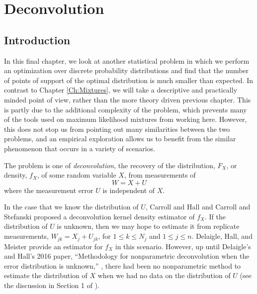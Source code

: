 \chapter{Deconvolution}
\label{Ch:Deconvolution}




\section{Introduction}
	In this final chapter, we look at another statistical problem in which we perform an optimization over discrete probability distributions and find that the number of points of support of the optimal distribution is much smaller than expected. In contrast to Chapter \ref{Ch:Mixtures}, we will take a descriptive and practically minded point of view, rather than the more theory driven previous chapter. This is partly due to the additional complexity of the problem, which prevents many of the tools used on maximum likelihood mixtures from working here. However, this does not stop us from pointing out many similarities between the two problems, and an empirical exploration allows us to benefit from the similar phenomenon that occurs in a variety of scenarios.

	The problem is one of \emph{deconvolution}, the recovery of the distribution, $F_X$, or density, $f_X$, of some random variable $X$, from measurements of
	\begin{equation}
		W = X + U
	\end{equation}
	where the measurement error $U$ is independent of $X$. 

	In the case that we know the distribution of $U$, Carroll and Hall \cite{Carroll1988-aj} and Carroll and Stefanski \cite{Stefanski1990-uo} proposed a deconvolution kernel density estimator of $f_X$. If the distribution of $U$ is unknown, then we may hope to estimate it from replicate measurements, $W_{jk} = X_j + U_{jk}$, for $1 \leq k \leq N_j$ and $1 \leq j \leq n$. Delaigle, Hall, and Meister provide an estimator for $f_X$ in this scenario. However, up until Delaigle's and Hall's 2016 paper, ``Methodology for nonparametric deconvolution when the error distribution is unknown,'' \cite{Delaigle2016-la}, there had been no nonparametric method to estimate the distribution of $X$ when we had no data on the distribution of $U$ (see the discussion in Section 1 of \cite{Delaigle2016-la}).

